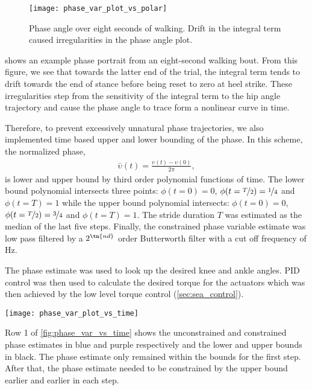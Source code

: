 \begin{figure}[t]
    \centering 
    \texttt{[image: phase\_var\_plot\_vs\_polar]}
    \caption[Phase angle over eight seconds of walking.]{Phase angle over eight
    seconds of walking. Drift in the integral term caused irregularities in the
    phase angle plot.}\label{fig:phase_var_polar}
\end{figure}
 shows an example phase portrait from an eight-second
walking bout. From this figure, we see that towards the latter end of the trial,
the integral term tends to drift towards the end of stance before being reset to
zero at heel strike. These irregularities step from the sensitivity of the
integral term to the hip angle trajectory and cause the phase angle to trace
form a nonlinear curve in time.

Therefore, to prevent excessively unnatural phase trajectories, we also
implemented time based upper and lower bounding of the phase. In this scheme,
the normalized phase,
\begin{align}
    \bar \upsilon(t) = \frac{\upsilon(t) - \upsilon(0)}{2 \pi},
\end{align}
is lower and upper bound by third order polynomial functions of time. The lower
bound polynomial intersects three points: $\phi(t=0) = 0$,
$\phi(t=\nicefrac{T}{2}) = \nicefrac{1}{4}$ and $\phi(t = T) = 1$ while the
upper bound polynomial intersects: $\phi(t=0) = 0$,
$\phi(t=\nicefrac{T}{2}) = \nicefrac{3}{4}$ and $\phi(t = T) = 1$. The stride
duration $T$ was estimated as the median of the last five steps. Finally, the
constrained phase variable estimate was low pass filtered by a $2^\tn{nd}$ order
Butterworth filter with a cut off frequency of \unit[10]{Hz}.

The phase estimate was used to look up the desired knee and ankle angles. PID
control was then used to calculate the desired torque for the actuators which
was then achieved by the low level torque control (\cref{sec:sea_control}).

\begin{figure*}[t]
    \centering 
    \texttt{[image: phase\_var\_plot\_vs\_time]}
    \caption[Results from test of unified phase variable controller.]{Results
    from test of unified phase variable controller. Step to step variability
    causes significant divergence in the integral term, leading to an unstable
    phase estimate.}\label{fig:phase_var_vs_time}
\end{figure*}
Row 1 of \cref{fig:phase_var_vs_time} shows the unconstrained and constrained
phase estimates in blue and purple respectively and the lower and upper bounds
in black. The phase estimate only remained within the bounds for the first step.
After that, the phase estimate needed to be constrained by the upper bound
earlier and earlier in each step.

